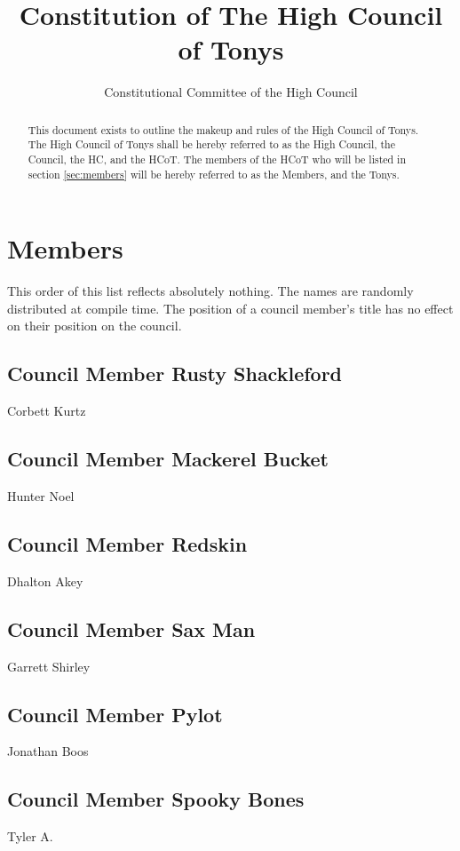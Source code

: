 \documentclass[letterpaper]{article}
\title{Constitution of The High Council of Tonys}
\author{Constitutional Committee of the High Council}
\begin{document}
	
\maketitle



\begin{abstract}
	This document exists to outline the makeup and rules of the High Council of Tonys. The High Council of Tonys shall be hereby referred to as the High Council, the Council, the HC, and the HCoT. The members of the HCoT who will be listed in section \ref{sec:members} will be hereby referred to as the Members, and the Tonys.
\end{abstract}

\newpage
\tableofcontents

\newpage
\section{Members}
\label{sec:members}
	This order of this list reflects absolutely nothing. The names are randomly distributed at compile time. The position of a council member's title has no effect on their position on the council.
	\subsection{Council Member Rusty Shackleford}
	\label{subsec:corbett}
		Corbett Kurtz
	\subsection{Council Member Mackerel Bucket}
	\label{subsec:hunter}
		Hunter Noel
	\subsection{Council Member Redskin}
	\label{subsec:dhalton}
		Dhalton Akey
	\subsection{Council Member Sax Man}
	\label{subsec:garrett}
		Garrett Shirley
	\subsection{Council Member Pylot}
	\label{subsec:jon}
		Jonathan Boos
	\subsection{Council Member Spooky Bones}
	\label{subsec:tyler}
		Tyler A.
\end{document}
